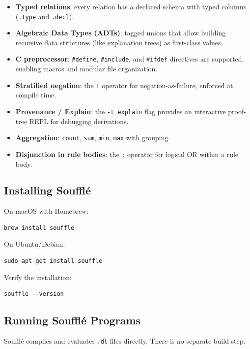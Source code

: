 \documentclass[11pt,letterpaper]{article}
\begin{document}
\begin{itemize}
  \item \textbf{Typed relations}: every relation has a declared schema with typed columns (\texttt{.type} and \texttt{.decl}).
  \item \textbf{Algebraic Data Types (ADTs)}: tagged unions that allow building recursive data structures (like explanation trees) as first-class values.
  \item \textbf{C preprocessor}: \texttt{\#define}, \texttt{\#include}, and \texttt{\#ifdef} directives are supported, enabling macros and modular file organization.
  \item \textbf{Stratified negation}: the \texttt{!} operator for negation-as-failure, enforced at compile time.
  \item \textbf{Provenance / Explain}: the \texttt{-t explain} flag provides an interactive proof-tree REPL for debugging derivations.
  \item \textbf{Aggregation}: \texttt{count}, \texttt{sum}, \texttt{min}, \texttt{max} with grouping.
  \item \textbf{Disjunction in rule bodies}: the \texttt{;} operator for logical OR within a rule body.
\end{itemize}

\subsection{Installing Souffl\'{e}}

On macOS with Homebrew:
\begin{lstlisting}[style=bashstyle]
brew install souffle
\end{lstlisting}

On Ubuntu/Debian:
\begin{lstlisting}[style=bashstyle]
sudo apt-get install souffle
\end{lstlisting}

Verify the installation:
\begin{lstlisting}[style=bashstyle]
souffle --version
\end{lstlisting}

\subsection{Running Souffl\'{e} Programs}

Souffl\'{e} compiles and evaluates \texttt{.dl} files directly. There is no separate build step.
\end{document}
